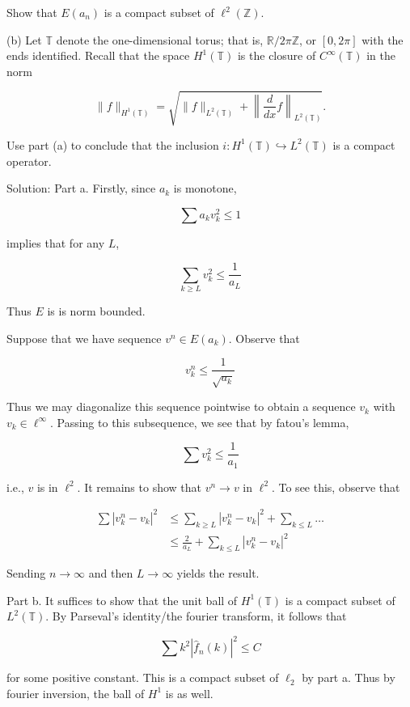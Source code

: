 \documentclass[10pt]{article}
\begin{document}
Show that $E\left(a_{n}\right)$ is a compact subset of $\ell^{2}(\mathbb{Z})$.

(b) Let $\mathbb{T}$ denote the one-dimensional torus; that is, $\mathbb{R} / 2 \pi \mathbb{Z}$, or $[0,2 \pi]$ with the ends identified. Recall that the space $H^{1}(\mathbb{T})$ is the closure of $C^{\infty}(\mathbb{T})$ in the norm

$$
\|f\|_{H^{1}(\mathbb{T})}=\sqrt{\|f\|_{L^{2}(\mathbb{T})}+\left\|\frac{d}{d x} f\right\|_{L^{2}(\mathbb{T})}} .
$$

Use part (a) to conclude that the inclusion $i: H^{1}(\mathbb{T}) \hookrightarrow L^{2}(\mathbb{T})$ is a compact operator.

Solution: Part a. Firstly, since $a_{k}$ is monotone,

$$
\sum a_{k} v_{k}^{2} \leq 1
$$

implies that for any $L$,

$$
\sum_{k \geq L} v_{k}^{2} \leq \frac{1}{a_{L}}
$$

Thus $E$ is is norm bounded.

Suppose that we have sequence $v^{n} \in E\left(a_{k}\right)$. Observe that

$$
v_{k}^{n} \leq \frac{1}{\sqrt{a_{k}}}
$$

Thus we may diagonalize this sequence pointwise to obtain a sequence $v_{k}$ with $v_{k} \in \ell^{\infty}$. Passing to this subsequence, we see that by fatou's lemma,

$$
\sum v_{k}^{2} \leq \frac{1}{a_{1}}
$$

i.e., $v$ is in $\ell^{2}$. It remains to show that $v^{n} \rightarrow v$ in $\ell^{2}$. To see this, observe that

$$
\begin{aligned}
\sum\left|v_{k}^{n}-v_{k}\right|^{2} & \leq \sum_{k \geq L}\left|v_{k}^{n}-v_{k}\right|^{2}+\sum_{k \leq L} \ldots \\
& \leq \frac{2}{a_{L}}+\sum_{k \leq L}\left|v_{k}^{n}-v_{k}\right|^{2}
\end{aligned}
$$

Sending $n \rightarrow \infty$ and then $L \rightarrow \infty$ yields the result.

Part b. It suffices to show that the unit ball of $H^{1}(\mathbb{T})$ is a compact subset of $L^{2}(\mathbb{T})$. By Parseval's identity/the fourier transform, it follows that

$$
\sum k^{2}\left|\hat{f}_{n}(k)\right|^{2} \leq C
$$

for some positive constant. This is a compact subset of $\ell_{2}$ by part a. Thus by fourier inversion, the ball of $H^{1}$ is as well.
\end{document}
